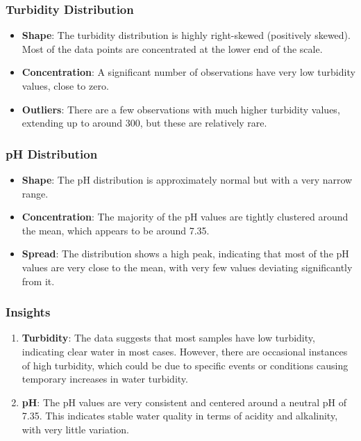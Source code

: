 \documentclass[12pt]{report}
\begin{document}
\subsubsection{Turbidity Distribution}
\begin{itemize}
    \item \textbf{Shape}: The turbidity distribution is highly right-skewed (positively skewed). Most of the data points are concentrated at the lower end of the scale.
    \item \textbf{Concentration}: A significant number of observations have very low turbidity values, close to zero.
    \item \textbf{Outliers}: There are a few observations with much higher turbidity values, extending up to around 300, but these are relatively rare.
\end{itemize}
\subsubsection{pH Distribution}
\begin{itemize}
    \item \textbf{Shape}: The pH distribution is approximately normal but with a very narrow range.
    \item \textbf{Concentration}: The majority of the pH values are tightly clustered around the mean, which appears to be around 7.35.
    \item \textbf{Spread}: The distribution shows a high peak, indicating that most of the pH values are very close to the mean, with very few values deviating significantly from it.
\end{itemize}

\subsubsection*{Insights}
\begin{enumerate}
    \item \textbf{Turbidity}: The data suggests that most samples have low turbidity, indicating clear water in most cases. However, there are occasional instances of high turbidity, which could be due to specific events or conditions causing temporary increases in water turbidity.
    \item \textbf{pH}: The pH values are very consistent and centered around a neutral pH of 7.35. This indicates stable water quality in terms of acidity and alkalinity, with very little variation.
\end{enumerate}
\end{document}
